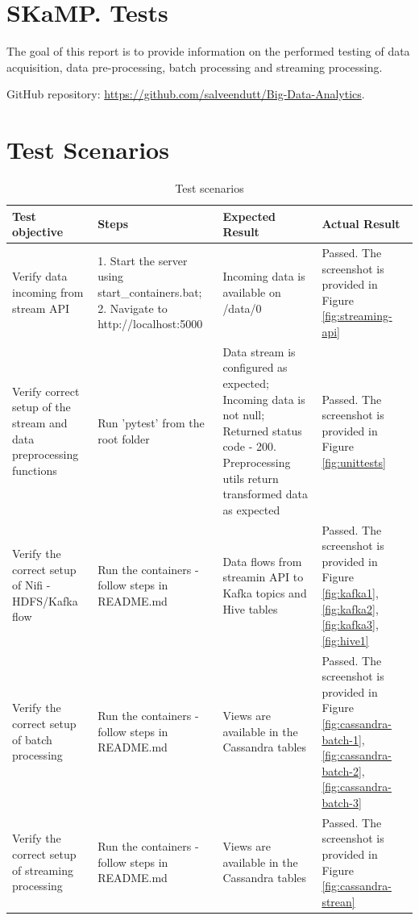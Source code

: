 \documentclass[12pt,a4paper, hidelinks]{article}
\begin{document}
\section*{SKaMP. Tests}
\vspace{\baselineskip} %

The goal of this report is to provide information on the performed testing of data acquisition, data pre-processing, batch processing and streaming processing.

GitHub repository: \href{https://github.com/salveendutt/Big-Data-Analytics}{https://github.com/salveendutt/Big-Data-Analytics}.

\section{Test Scenarios}

\begin{table}[h!]
\centering
\begin{tabular}{|p{3cm}|p{4cm}|p{3cm}|p{5cm}|}
\hline
\textbf{Test objective} & \textbf{Steps} & \textbf{Expected Result} & \textbf{Actual Result} \\
\hline
Verify data incoming from stream API & 1. Start the server using start\_containers.bat; 2. Navigate to http://localhost:5000 & Incoming data is available on /data/0 & Passed. The screenshot is provided in Figure \ref{fig:streaming-api} \\
\hline
Verify correct setup of the stream and data preprocessing functions & Run 'pytest' from the root folder & Data stream is configured as expected; Incoming data is not null; Returned status code - 200. Preprocessing utils return transformed data as expected & Passed. The screenshot is provided in Figure \ref{fig:unittests} \\
\hline
Verify the correct setup of Nifi - HDFS/Kafka flow & Run the containers - follow steps in README.md & Data flows from streamin API to Kafka topics and Hive tables & Passed. The screenshot is provided in Figure \ref{fig:kafka1}, \ref{fig:kafka2}, \ref{fig:kafka3}, \ref{fig:hive1} \\
\hline
Verify the correct setup of batch processing & Run the containers - follow steps in README.md & Views are available in the Cassandra tables & Passed. The screenshot is provided in Figure \ref{fig:cassandra-batch-1}, \ref{fig:cassandra-batch-2}, \ref{fig:cassandra-batch-3} \\
\hline
Verify the correct setup of streaming processing & Run the containers - follow steps in README.md & Views are available in the Cassandra tables & Passed. The screenshot is provided in Figure \ref{fig:cassandra-strean} \\
\hline

\end{tabular}
\caption{Test scenarios}
\end{table}
\end{document}
